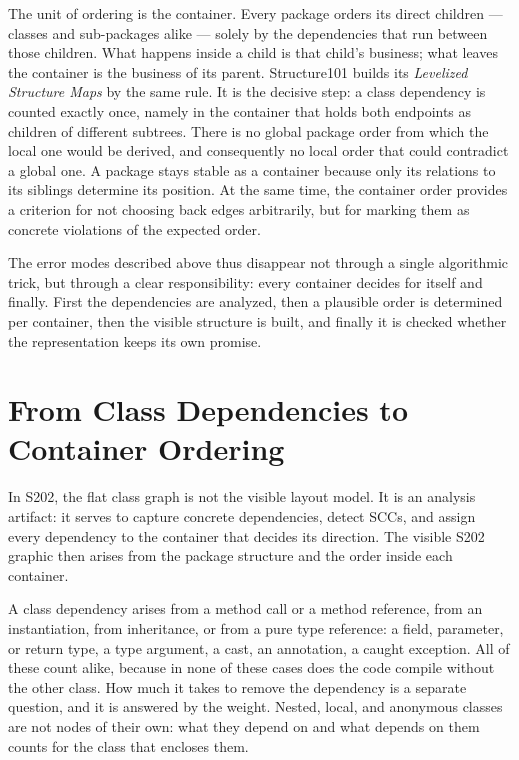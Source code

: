 \documentclass[a4paper,11pt]{article}
\begin{document}
The unit of ordering is the container. Every package orders its direct
children — classes and sub-packages alike — solely by the dependencies that
run between those children. What happens inside a child is that child's
business; what leaves the container is the business of its parent. Structure101
builds its \emph{Levelized Structure Maps} by the same rule. It is the decisive
step: a class dependency is counted exactly once, namely in the container that
holds both endpoints as children of different subtrees. There is no global
package order from which the local one would be derived, and consequently no
local order that could contradict a global one. A package stays stable as a
container because only its relations to its siblings determine its position.
At the same time, the container order provides a criterion for not choosing
back edges arbitrarily, but for marking them as concrete violations of the
expected order.

The error modes described above thus disappear not through a single
algorithmic trick, but through a clear responsibility: every container decides
for itself and finally. First the dependencies are analyzed, then a plausible
order is determined per container, then the visible structure is built, and
finally it is checked whether the representation keeps its own promise.

\section{From Class Dependencies to Container Ordering}

In S202, the flat class graph is not the visible layout model. It is an
analysis artifact: it serves to capture concrete dependencies, detect SCCs,
and assign every dependency to the container that decides its direction. The
visible S202 graphic then arises from the package structure and the order
inside each container.

A class dependency arises from a method call or a method reference, from an
instantiation, from inheritance, or from a pure type reference: a field,
parameter, or return type, a type argument, a cast, an annotation, a caught
exception. All of these count alike, because in none of these cases does the
code compile without the other class. How much it takes to remove the
dependency is a separate question, and it is answered by the weight. Nested,
local, and anonymous classes are not nodes of their own: what they depend on and
what depends on them counts for the class that encloses them.
\end{document}
